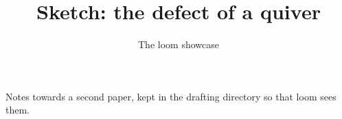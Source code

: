 \documentclass{amsart}
\title{Sketch: the defect of a quiver}
\author{The loom showcase}
\theoremstyle{plain}
\begin{document}
\maketitle

Notes towards a second paper, kept in the drafting directory so that loom sees them.


\end{document}
